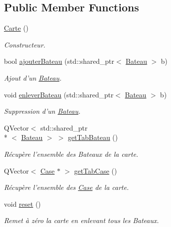 \subsection*{Public Member Functions}
\begin{DoxyCompactItemize}
\item 
\hyperlink{classCarte_a06daaca86c31c80f8308f4a81d46dc9b}{Carte} ()
\begin{DoxyCompactList}\small\item\em Constructeur. \end{DoxyCompactList}\item 
bool \hyperlink{classCarte_a8415ea8b3274e0fddecc122d83ce80a9}{ajouter\+Bateau} (std\+::shared\+\_\+ptr$<$ \hyperlink{classBateau}{Bateau} $>$ b)
\begin{DoxyCompactList}\small\item\em Ajout d'un \hyperlink{classBateau}{Bateau}. \end{DoxyCompactList}\item 
void \hyperlink{classCarte_ae4966ed5306a6f85453b556830935026}{enlever\+Bateau} (std\+::shared\+\_\+ptr$<$ \hyperlink{classBateau}{Bateau} $>$ b)
\begin{DoxyCompactList}\small\item\em Suppression d'un \hyperlink{classBateau}{Bateau}. \end{DoxyCompactList}\item 
Q\+Vector$<$ std\+::shared\+\_\+ptr\\*
$<$ \hyperlink{classBateau}{Bateau} $>$ $>$ \hyperlink{classCarte_ac05b028a316243ba5e66d4bfab48f6fa}{get\+Tab\+Bateau} ()
\begin{DoxyCompactList}\small\item\em Récupère l'ensemble des Bateaux de la carte. \end{DoxyCompactList}\item 
Q\+Vector$<$ \hyperlink{classCase}{Case} $\ast$ $>$ \hyperlink{classCarte_a6974f6c1fb5884205ba7b45f6ef7c89c}{get\+Tab\+Case} ()
\begin{DoxyCompactList}\small\item\em Récupère l'ensemble des \hyperlink{classCase}{Case} de la carte. \end{DoxyCompactList}\item 
void \hyperlink{classCarte_a108f801be6118ec28cf29102a68b4e9f}{reset} ()
\begin{DoxyCompactList}\small\item\em Remet à zéro la carte en enlevant tous les Bateaux. \end{DoxyCompactList}\end{DoxyCompactItemize}
